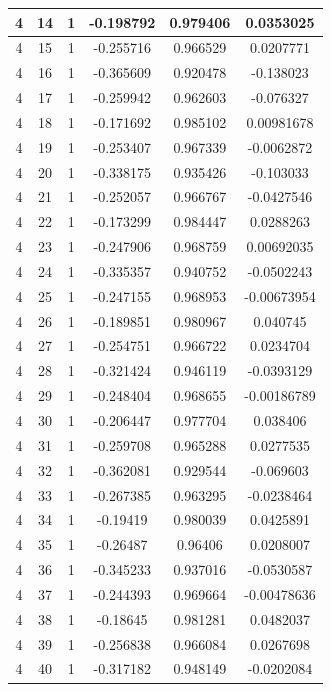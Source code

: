 \documentclass[12pt,a4paper]{article}
\numberwithin{equation}{section}
\numberwithin{figure}{section}
\numberwithin{table}{section}
\begin{document}
\begin{longtable}{|c|c|c|c|c|c|}
4 & 14 & 1 & -0.198792 & 0.979406 & 0.0353025 \\ \hline
4 & 15 & 1 & -0.255716 & 0.966529 & 0.0207771 \\ \hline
4 & 16 & 1 & -0.365609 & 0.920478 & -0.138023 \\ \hline
4 & 17 & 1 & -0.259942 & 0.962603 & -0.076327 \\ \hline
4 & 18 & 1 & -0.171692 & 0.985102 & 0.00981678 \\ \hline
4 & 19 & 1 & -0.253407 & 0.967339 & -0.0062872 \\ \hline
4 & 20 & 1 & -0.338175 & 0.935426 & -0.103033 \\ \hline
4 & 21 & 1 & -0.252057 & 0.966767 & -0.0427546 \\ \hline
4 & 22 & 1 & -0.173299 & 0.984447 & 0.0288263 \\ \hline
4 & 23 & 1 & -0.247906 & 0.968759 & 0.00692035 \\ \hline
4 & 24 & 1 & -0.335357 & 0.940752 & -0.0502243 \\ \hline
4 & 25 & 1 & -0.247155 & 0.968953 & -0.00673954 \\ \hline
4 & 26 & 1 & -0.189851 & 0.980967 & 0.040745 \\ \hline
4 & 27 & 1 & -0.254751 & 0.966722 & 0.0234704 \\ \hline
4 & 28 & 1 & -0.321424 & 0.946119 & -0.0393129 \\ \hline
4 & 29 & 1 & -0.248404 & 0.968655 & -0.00186789 \\ \hline
4 & 30 & 1 & -0.206447 & 0.977704 & 0.038406 \\ \hline
4 & 31 & 1 & -0.259708 & 0.965288 & 0.0277535 \\ \hline
4 & 32 & 1 & -0.362081 & 0.929544 & -0.069603 \\ \hline
4 & 33 & 1 & -0.267385 & 0.963295 & -0.0238464 \\ \hline
4 & 34 & 1 & -0.19419 & 0.980039 & 0.0425891 \\ \hline
4 & 35 & 1 & -0.26487 & 0.96406 & 0.0208007 \\ \hline
4 & 36 & 1 & -0.345233 & 0.937016 & -0.0530587 \\ \hline
4 & 37 & 1 & -0.244393 & 0.969664 & -0.00478636 \\ \hline
4 & 38 & 1 & -0.18645 & 0.981281 & 0.0482037 \\ \hline
4 & 39 & 1 & -0.256838 & 0.966084 & 0.0267698 \\ \hline
4 & 40 & 1 & -0.317182 & 0.948149 & -0.0202084 \\ \hline

\end{longtable}
\end{document}
